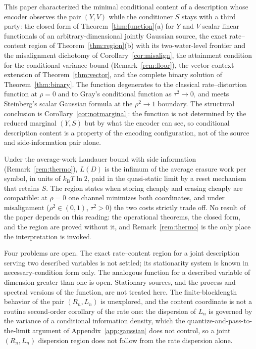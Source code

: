 \documentclass[11pt,onecolumn]{IEEEtran}
\newcommand{\kb}{k_{\mathrm{B}}}
\begin{document}
This paper characterized the minimal conditional content of a description
whose encoder observes the pair $(Y,V)$ while the conditioner $S$ stays with
a third party: the closed form of Theorem~\ref{thm:function}(a) for $Y$ and
$V$ scalar linear functionals of an arbitrary-dimensional jointly Gaussian
source, the exact rate--content region of Theorem~\ref{thm:region}(b) with
its two-water-level frontier and the misalignment dichotomy of
Corollary~\ref{cor:misalign}, the attainment condition for the conditional-variance bound
(Remark~\ref{rem:floor}), the vector-context extension of
Theorem~\ref{thm:vector}, and the complete binary solution of
Theorem~\ref{thm:binary}. The function degenerates to the classical
rate--distortion function at $\rho=0$ and to Gray's conditional function as
$\tau^2\to0$, and meets Steinberg's scalar Gaussian formula at the
$\rho^2\to1$ boundary. The structural conclusion is
Corollary~\ref{cor:notmarginal}: the function is not determined by the
reduced marginal $(Y,S)$ but by what the encoder can see, so conditional
description content is a property of the encoding configuration, not of the
source and side-information pair alone.

Under the average-work Landauer bound with side information
(Remark~\ref{rem:thermo}), $L(D)$ is the infimum of the average erasure work per symbol, in
units of $\kb T\ln2$, paid in the quasi-static limit by a reset
mechanism that retains $S$. The region states when storing
cheaply and erasing cheaply are compatible: at $\rho=0$ one channel minimizes
both coordinates, and under misalignment ($\rho^2\in(0,1)$, $\tau^2>0$) the
two costs strictly trade off. No result of the paper depends on this
reading: the operational theorems, the closed form, and the region are
proved without it, and Remark~\ref{rem:thermo} is the only place the
interpretation is invoked.

Four problems are open. The exact rate--content region for a joint
description serving two described variables is not settled; its stationarity
system is known in necessary-condition form only. The analogous function for
a described variable of dimension greater than one is open. Stationary
sources, and the process and spectral versions of the function, are not
treated here. The finite-blocklength behavior of the pair $(R_n,L_n)$ is
unexplored, and the content coordinate is not a routine second-order
corollary of the rate one: the dispersion of $L_n$ is governed by the
variance of a conditional information density, which the
quantize-and-pass-to-the-limit argument of Appendix~\ref{app:gaussian}
does not control, so a joint $(R_n,L_n)$ dispersion region does
not follow from the rate dispersion alone.
\end{document}
